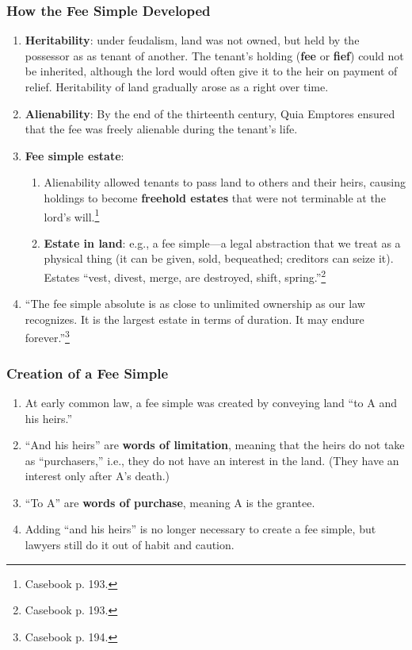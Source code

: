 \subsubsection{How the Fee Simple Developed}

\begin{enumerate}
    \item \textbf{Heritability}: under feudalism, land was not owned, but held 
    by the possessor as as tenant of another. The tenant's holding 
    (\textbf{fee} or \textbf{fief}) could not be inherited, although the lord 
    would often give it to the heir on payment of relief. Heritability of land 
    gradually arose as a right over time.
    \item \textbf{Alienability}: By the end of the thirteenth century, Quia Emptores 
    ensured that the fee was freely alienable during the tenant's life.
    \item \textbf{Fee simple estate}:
    \begin{enumerate}
        \item Alienability allowed tenants to pass land to others and their 
        heirs, causing holdings to become \textbf{freehold estates} that were 
        not terminable at the lord's will.\footnote{Casebook p. 193.}
        \item \textbf{Estate in land}: e.g., a fee simple---a legal 
        abstraction that we treat as a physical thing (it can be given, sold, 
        bequeathed; creditors can seize it). Estates ``vest, divest, merge, 
        are destroyed, shift, spring.''\footnote{Casebook p. 193.}
    \end{enumerate}
    \item ``The fee simple absolute is as close to unlimited ownership as our 
    law recognizes. It is the largest estate in terms of duration. It may 
    endure forever.''\footnote{Casebook p. 194.}
\end{enumerate}

\subsubsection{Creation of a Fee Simple}

\begin{enumerate}
    \item At early common law, a fee simple was created by conveying land ``to 
    A and his heirs.''
    \item ``And his heirs'' are \textbf{words of limitation}, meaning that the 
    heirs do not take as ``purchasers,'' i.e., they do not have an interest in 
    the land. (They have an interest only after A's death.)
    \item ``To A'' are \textbf{words of purchase}, meaning A is the grantee.
    \item Adding ``and his heirs'' is no longer necessary to create a fee 
    simple, but lawyers still do it out of habit and caution.
\end{enumerate}

